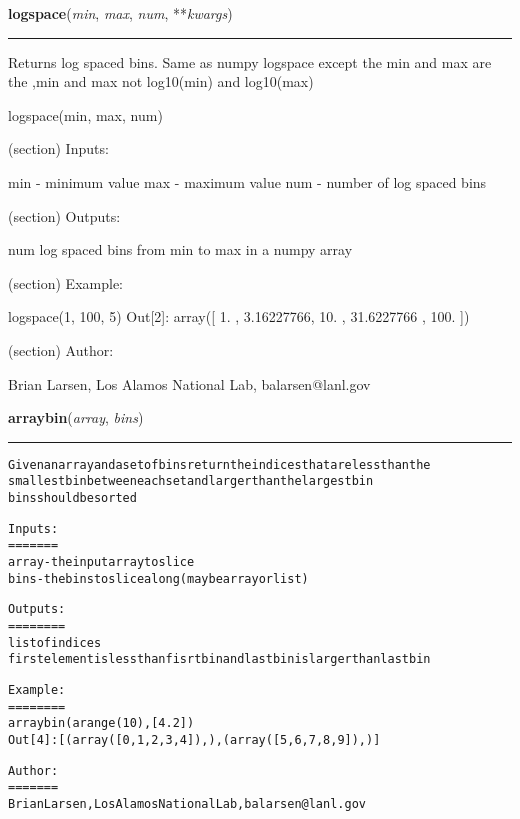 \hspace{.8\funcindent}\begin{boxedminipage}{\funcwidth}

    \raggedright \textbf{logspace}(\textit{min}, \textit{max}, \textit{num}, **\textit{kwargs})

    \vspace{-1.5ex}

    \rule{\textwidth}{0.5\fboxrule}
\setlength{\parskip}{2ex}
    Returns log spaced bins.  Same as numpy logspace except the min and max
    are the ,min and max not log10(min) and log10(max)

    logspace(min, max, num)

    (section) Inputs:

      min - minimum value max - maximum value num - number of log spaced 
      bins

    (section) Outputs:

      num log spaced bins from min to max in a numpy array

    (section) Example:

      logspace(1, 100, 5) Out[2]: array([   1.        ,    3.16227766,   
      10.        ,   31.6227766 ,  100.        ])

    (section) Author:

      Brian Larsen, Los Alamos National Lab, balarsen@lanl.gov

\setlength{\parskip}{1ex}
    \end{boxedminipage}

    \label{spacepy:toolbox:arraybin}

    \vspace{0.5ex}

\hspace{.8\funcindent}\begin{boxedminipage}{\funcwidth}

    \raggedright \textbf{arraybin}(\textit{array}, \textit{bins})

    \vspace{-1.5ex}

    \rule{\textwidth}{0.5\fboxrule}
\setlength{\parskip}{2ex}
\begin{alltt}
Given an array and a set of bins return the indices that are less than the 
smallest bin between each set and larger than the largest bin
bins should be sorted

Inputs:
=======
array - the input array to slice
bins - the bins to slice along (may be array or list)

Outputs:
========
list of indices 
     first element is less than fisrt bin and last bin is larger than last bin

Example:
========
arraybin(arange(10), [4.2])
Out[4]: [(array([0, 1, 2, 3, 4]),), (array([5, 6, 7, 8, 9]),)]

Author:
=======
Brian Larsen, Los Alamos National Lab, balarsen@lanl.gov
\end{alltt}

\setlength{\parskip}{1ex}
    \end{boxedminipage}

